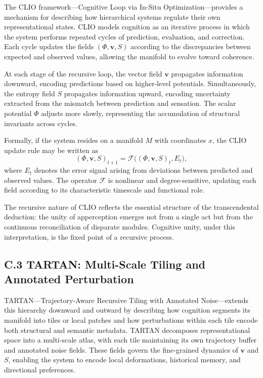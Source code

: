 \documentclass[12pt]{article}
\begin{document}
The CLIO framework---Cognitive Loop via In-Situ Optimization---provides a 
mechanism for describing how hierarchical systems regulate their own 
representational states. CLIO models cognition as an iterative process in which 
the system performs repeated cycles of prediction, evaluation, and correction.  
Each cycle updates the fields $(\Phi, \mathbf{v}, S)$ according to the 
discrepancies between expected and observed values, allowing the manifold to 
evolve toward coherence.

At each stage of the recursive loop, the vector field $\mathbf{v}$ propagates 
information downward, encoding predictions based on higher-level potentials.  
Simultaneously, the entropy field $S$ propagates information upward, encoding 
uncertainty extracted from the mismatch between prediction and sensation. The 
scalar potential $\Phi$ adjusts more slowly, representing the accumulation of 
structural invariants across cycles.

Formally, if the system resides on a manifold $M$ with coordinates $x$, the 
CLIO update rule may be written as
\[
(\Phi,\mathbf{v},S)_{t+1}
=
\mathcal{F}\big((\Phi,\mathbf{v},S)_t, E_t\big),
\]
where $E_t$ denotes the error signal arising from deviations between predicted 
and observed values. The operator $\mathcal{F}$ is nonlinear and 
degree-sensitive, updating each field according to its characteristic timescale 
and functional role.

The recursive nature of CLIO reflects the essential structure of the 
transcendental deduction: the unity of apperception emerges not from a single 
act but from the continuous reconciliation of disparate modules. Cognitive 
unity, under this interpretation, is the fixed point of a recursive process.

\subsection*{C.3 TARTAN: Multi-Scale Tiling and Annotated Perturbation}

TARTAN---Trajectory-Aware Recursive Tiling with Annotated Noise---extends this 
hierarchy downward and outward by describing how cognition segments its 
manifold into tiles or local patches and how perturbations within each tile 
encode both structural and semantic metadata. TARTAN decomposes representational 
space into a multi-scale atlas, with each tile maintaining its own trajectory 
buffer and annotated noise fields. These fields govern the fine-grained 
dynamics of $\mathbf{v}$ and $S$, enabling the system to encode local 
deformations, historical memory, and directional preferences.
\end{document}
